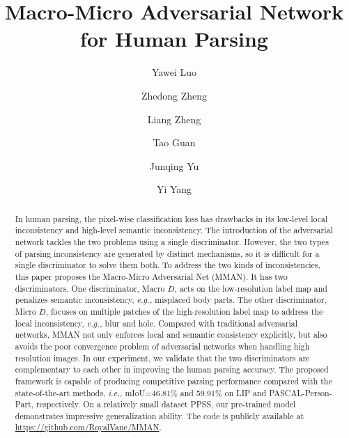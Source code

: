 \documentclass[runningheads]{llncs}
\begin{document}
\pagestyle{headings}
\mainmatter
\def\ECCV18SubNumber{597}  

\title{Macro-Micro Adversarial Network \\ for Human Parsing} 


\author{Yawei Luo \and
Zhedong Zheng \and
Liang Zheng \and
Tao Guan \and
Junqing Yu \and
Yi Yang}


\maketitle
\begin{abstract}
In human parsing, the pixel-wise classification loss has drawbacks in its low-level local inconsistency and high-level semantic inconsistency. The introduction of the adversarial network tackles the two problems using a single discriminator. However, the two types of parsing inconsistency are generated by distinct mechanisms, so it is difficult for a single discriminator to solve them both. To address the two kinds of inconsistencies, this paper proposes the Macro-Micro Adversarial Net (MMAN). It has two discriminators. One discriminator, Macro $D$, acts on the low-resolution label map and penalizes semantic inconsistency, \emph{e.g.,} misplaced body parts. The other discriminator, Micro $D$, focuses on multiple patches of the high-resolution label map to address the local inconsistency, \emph{e.g.,} blur and hole. Compared with traditional adversarial networks, MMAN not only enforces local and semantic consistency explicitly, but also avoids the poor convergence problem of adversarial networks when handling high resolution images.
In our experiment, we validate that the two discriminators are complementary to each other in improving the human parsing accuracy. The proposed framework is capable of producing competitive parsing performance compared with the state-of-the-art methods, \emph{i.e.,} mIoU=46.81\% and 59.91\% on LIP and PASCAL-Person-Part, respectively. On a relatively small dataset PPSS, our pre-trained model demonstrates impressive generalization ability. The code is publicly available at \url{https://github.com/RoyalVane/MMAN}.

\end{abstract}
\end{document}
